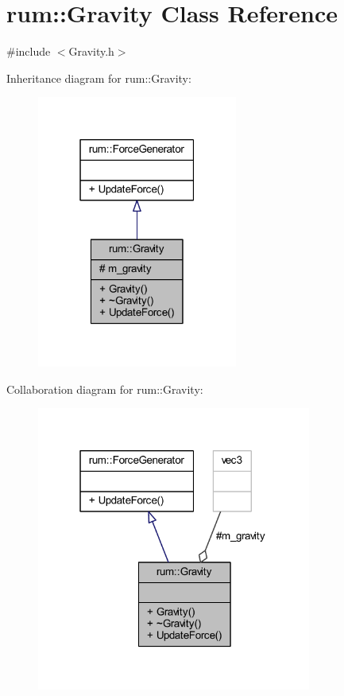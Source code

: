 \hypertarget{classrum_1_1_gravity}{}\section{rum\+:\+:Gravity Class Reference}
\label{classrum_1_1_gravity}


{\ttfamily \#include $<$Gravity.\+h$>$}



Inheritance diagram for rum\+:\+:Gravity\+:\nopagebreak
\begin{figure}[H]
\begin{center}
\leavevmode
\includegraphics[width=187pt]{classrum_1_1_gravity__inherit__graph}
\end{center}
\end{figure}


Collaboration diagram for rum\+:\+:Gravity\+:\nopagebreak
\begin{figure}[H]
\begin{center}
\leavevmode
\includegraphics[width=256pt]{classrum_1_1_gravity__coll__graph}
\end{center}
\end{figure}
